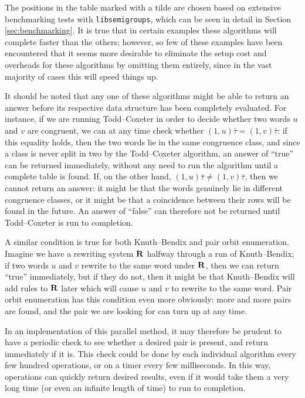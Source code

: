 The positions in the table marked with a tilde are chosen based on extensive
benchmarking tests with \texttt{libsemigroups}, which can be seen in detail in
Section \ref{sec:benchmarking}.  It is true that in certain examples these
algorithms will complete faster than the others; however, so few of these
examples have been encountered that it seems more desirable to eliminate the
setup cost and overheads for these algorithms by omitting them entirely, since
in the vast majority of cases this will speed things up.

It should be noted that any one of these algorithms might be able to return an
answer before its respective data structure has been completely evaluated.  For
instance, if we are running Todd--Coxeter in order to decide whether two words
$u$ and $v$ are congruent, we can at any time check whether
$(1,u)\bar\tau = (1,v)\bar\tau$: if this equality holds, then the two words lie
in the same congruence class, and since a class is never split in two by the
Todd--Coxeter algorithm, an answer of ``true'' can be returned immediately,
without any need to run the algorithm until a complete table is found.  If, on
the other hand, $(1,u)\bar\tau \neq (1,v)\bar\tau$, then we cannot return an
answer: it might be that the words genuinely lie in different congruence
classes, or it might be that a coincidence between their rows will be found in
the future.  An answer of ``false'' can therefore not be returned until
Todd--Coxeter is run to completion.

A similar condition is true for both Knuth--Bendix and pair orbit enumeration.
Imagine we have a rewriting system $\mathbf{R}$ halfway through a run of Knuth--Bendix;
if two words $u$ and $v$ rewrite to the same word under $\mathbf{R}$, then we can
return ``true'' immediately, but if they do not, then it might be that
Knuth--Bendix will add rules to $\mathbf{R}$ later which will cause $u$ and $v$ to
rewrite to the same word.  Pair orbit enumeration has this condition even more
obviously: more and more pairs are found, and the pair we are looking for can
turn up at any time.

In an implementation of this parallel method, it may therefore be prudent to
have a periodic check to see whether a desired pair is present, and return
immediately if it is.  This check could be done by each individual algorithm
every few hundred operations, or on a timer every few milliseconds.  In this
way, operations can quickly return desired results, even if it would take them a
very long time (or even an infinite length of time) to run to completion.


